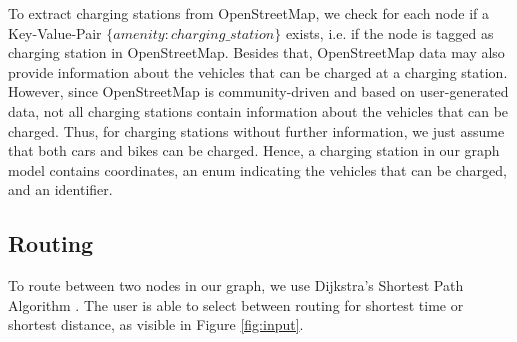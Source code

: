 \documentclass[a4paper]{article}
\begin{document}
To extract charging stations from OpenStreetMap, we check for each node if a Key-Value-Pair $\lbrace amenity: charging\_station \rbrace$ exists, i.e. if the node is tagged as charging station in OpenStreetMap.
Besides that, OpenStreetMap data may also provide information about the vehicles that can be charged at a charging station.
However, since OpenStreetMap is community-driven and based on user-generated data, not all charging stations contain information about the vehicles that can be charged.
Thus, for charging stations without further information, we just assume that both cars and bikes can be charged.
Hence, a charging station in our graph model contains coordinates, an enum indicating the vehicles that can be charged, and an identifier.
\subsection{Routing}
To route between two nodes in our graph, we use Dijkstra's Shortest Path Algorithm \cite{Dijkstra1959}.
The user is able to select between routing for shortest time or shortest distance, as visible in Figure \ref{fig:input}.
\end{document}

